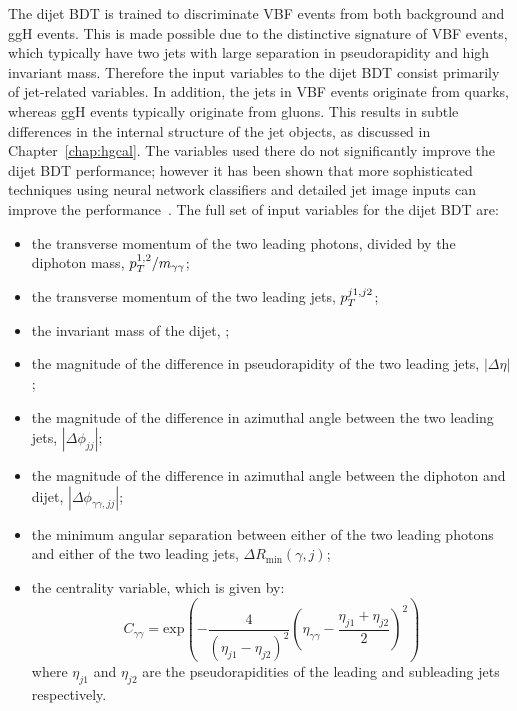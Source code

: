 The dijet BDT is trained to discriminate VBF events from both background and ggH events.
This is made possible due to the distinctive signature of VBF events, 
which typically have two jets with large separation in pseudorapidity and high invariant mass.
Therefore the input variables to the dijet BDT consist primarily of jet-related variables.
In addition, the jets in VBF events originate from quarks, 
whereas ggH events typically originate from gluons.
This results in subtle differences in the internal structure of the jet objects, 
as discussed in Chapter~\ref{chap:hgcal}.
The variables used there do not significantly improve the dijet BDT performance;
however it has been shown that more sophisticated techniques using neural network classifiers
and detailed jet image inputs can improve the performance~\cite{JackThesis}.
The full set of input variables for the dijet BDT are:
\begin{itemize}
\item the transverse momentum of the two leading photons, divided by the diphoton mass, $p_T^{1,2}/m_{\gamma\gamma}$;
\item the transverse momentum of the two leading jets, $p_T^{j1,j2}$;
\item the invariant mass of the dijet, \mjj;
\item the magnitude of the difference in pseudorapidity of the two leading jets, $|\Delta\eta|$;
\item the magnitude of the difference in azimuthal angle 
      between the two leading jets, $|\Delta\phi_{jj}|$;
\item the magnitude of the difference in azimuthal angle 
      between the diphoton and dijet, $|\Delta\phi_{\gamma\gamma,jj}|$;
\item the minimum angular separation between either of the two leading photons 
      and either of the two leading jets, $\Delta R_{\textrm{min}}(\gamma,j)$;
\item the centrality variable, which is given by:
\begin{equation}
C_{\gamma\gamma} = \mathrm{exp}\left(-\frac{4}{(\eta_{j1} - \eta_{j2})^{2}}\left( \eta_{\gamma\gamma} - \frac{\eta_{j1} + \eta_{j2}}{2} \right)^{2}\right)
\end{equation}
where $\eta_{j1}$ and $\eta_{j2}$ are the pseudorapidities of the 
leading and subleading jets respectively.
\end{itemize}

